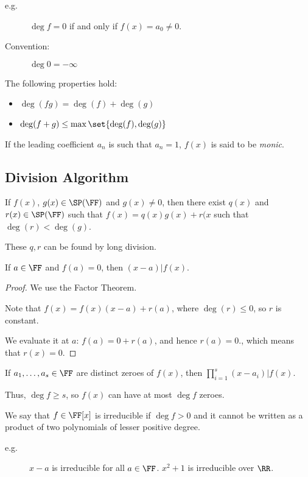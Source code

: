 \documentclass[11pt]{scrartcl}
\begin{document}
\begin{description}

\item[e.g.] $\deg f = 0$ if and only if $f(x) = a_0\neq 0$.
\item[Convention:] $\deg 0 = - \infty$
\end{description}

The following properties hold:

\begin{itemize}
\item $\deg(fg) = \deg(f) + \deg(g)$
\item $\deg(f+g) \leq \max \set{\deg(f), \deg (g)}$
\end{itemize}

\begin{definition}
If the leading coefficient $a_n$ is such that  $a_n=1$, $f(x)$ is said to be \textit{monic}.
\end{definition}

\subsection{Division Algorithm }

If $f(x)$, $g(x) \in \SP(\FF)$ and $g(x)\neq 0$, then there exist $q(x)$ and $r(x) \in \SP(\FF)$ such that $f(x) = q(x)g(x) + r(x{}$ such that $\deg(r) < \deg(g)$.

These $q, r$ can be found by long division.

\begin{lemma}
If $a\in\FF$ and $f(a)=0$, then $(x-a) | f(x)$.
\end{lemma}
\begin{proof}
  \hfill

We use the Factor Theorem. 

Note that  $f(x)=f(x)(x-a)+r(a)$, where $\deg(r)\leq 0$, so $r$ is constant.

We evaluate it at $a$: $f(a) = 0+ r(a)$, and hence $r(a) = 0$., which
means that $r(x) = 0$.
\end{proof}

\begin{lemma}
  If $a_1, \dots, a_{s} \in \FF$ are distinct zeroes of $f(x)$, then $\prod_{i=1}^s(x-a_i)|f(x)$.

  Thus, $\deg f \geq s$, so $f(x)$ can have at most $\deg f$ zeroes.
\end{lemma}

\begin{definition}
We say that $f\in \FF[x]$ is irreducible if $\deg f > 0$ and it cannot be written as a product of two polynomials of lesser positive degree.
\end{definition}
\begin{description}
\item[e.g.] $x-a$ is irreducible for all $a\in\FF$. $x^2+1$ is irreducible over $\RR$.
\end{description}
\end{document}
